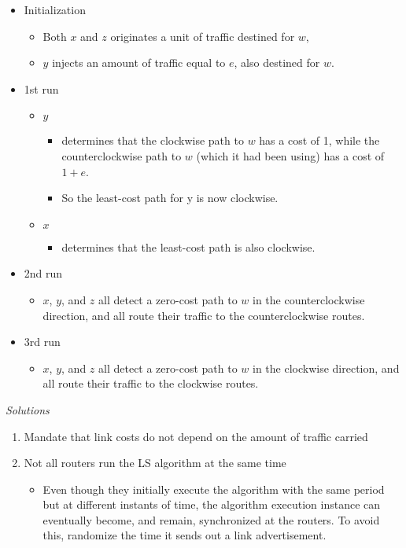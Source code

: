 \documentclass[a4paper]{article}
\begin{document}
\begin{itemize}
    \item Initialization
    \begin{itemize}[label=$\circ$]
        \item Both $x$ and $z$ originates a unit of traffic destined for $w$,
        \item $y$ injects an amount of traffic equal to $e$, also destined for $w$.
    \end{itemize}
    \item 1st run
    \begin{itemize}[label=$\circ$]
        \item $y$
        \begin{itemize}[label=\tiny$\blacksquare$]
            \item determines that the clockwise path to $w$ has a cost of 1, while the counterclockwise path to $w$ (which it had been using) has a cost of $1 + e$.
            \item So the least-cost path for y is now clockwise.
        \end{itemize}
        \item $x$
        \begin{itemize}
            \item determines that the least-cost path is also clockwise.
        \end{itemize}
    \end{itemize}
    \item 2nd run
    \begin{itemize}[label=$\circ$]
        \item $x$, $y$, and $z$ all detect a zero-cost path to $w$ in the counterclockwise direction, and all route their traffic to the counterclockwise routes.
    \end{itemize}
    \item 3rd run
    \begin{itemize}[label=$\circ$]
        \item $x$, $y$, and $z$ all detect a zero-cost path to $w$ in the clockwise direction, and all route their traffic to the clockwise routes.
    \end{itemize}
\end{itemize}

\medskip

\noindent\textit{Solutions}
\begin{enumerate}
    \item Mandate that link costs do not depend on the amount of traffic carried
    \item Not all routers run the LS algorithm at the same time
    \begin{itemize}[label=$\circ$]
        \item Even though they initially execute the algorithm with the same period but at different instants of time, the algorithm execution instance can eventually become, and remain, synchronized at the routers. To avoid this, randomize the time it sends out a link advertisement.
    \end{itemize}
\end{enumerate}
\end{document}
